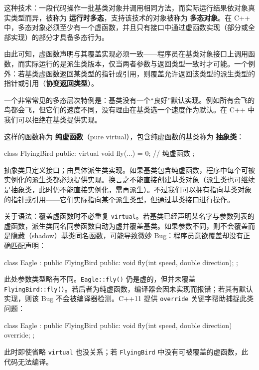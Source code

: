 这种技术：一段代码操作一批基类对象并调用相同方法，而实际运行结果依对象真实类型而异，被称为 \textbf{运行时多态}，支持该技术的对象被称为 \textbf{多态对象}。在 C++ 中，多态对象必须至少有一个虚函数，并且只有接口中通过虚函数实现（部分或全部实现）的部分才具备多态行为。

由此可知，虚函数声明与其覆盖实现必须一致——程序员在基类对象接口上调用函数，而实际运行的是派生类版本，仅当两者参数与返回类型一致时才可能。一个例外：若基类虚函数返回某类型的指针或引用，则覆盖允许返回该类型的派生类型的指针或引用（\textbf{协变返回类型}）。

一个非常常见的多态层次特例是：基类没有一个“良好”默认实现。例如所有会飞的鸟都会飞，但它们的速度不同，没有理由在基类选一个速度作为默认。在 C++ 中我们可以拒绝在基类提供实现。

这样的函数称为 \textbf{纯虚函数}（pure virtual），包含纯虚函数的基类称为 \textbf{抽象类}：

\begin{code}
class FlyingBird {
  public:
  virtual void fly(...) = 0;     // 纯虚函数
};
\end{code}

抽象类只定义接口；由具体派生类实现。如果基类包含纯虚函数，程序中每个可被实例化的派生类都必须提供实现。换言之不能直接创建基类对象（派生类也可继续是抽象类，此时仍不能直接实例化，需再派生）。不过我们可以拥有指向基类对象的指针或引用——它们实际指向某个派生类型，但通过基类接口进行操作。

关于语法：覆盖虚函数时不必重复 \texttt{virtual}。若基类已经声明某名字与参数列表的虚函数，派生类同名同参函数自动为虚并覆盖基类。如果参数不同，则不会覆盖而是隐藏（shadow）基类同名函数，可能导致微妙 Bug：程序员意欲覆盖却没有正确匹配声明：

\begin{code}
class Eagle : public FlyingBird {
  public:
  void fly(int speed, double direction);
};
\end{code}

此处参数类型略有不同。\texttt{Eagle::fly()} 仍是虚的，但并未覆盖 \texttt{FlyingBird::fly()}。若后者为纯虚函数，编译器会因未实现而报错；若其有默认实现，则该 Bug 不会被编译器检测。C++11 提供 \texttt{override} 关键字帮助捕捉此类问题：

\begin{code}
class Eagle : public FlyingBird {
  public:
  void fly(int speed, double direction) override;
};
\end{code}

此时即使省略 \texttt{virtual} 也没关系；若 \texttt{FlyingBird} 中没有可被覆盖的虚函数，此代码无法编译。

